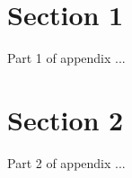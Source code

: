 
\section{Section 1}
\label{sec:appendixSec1}

Part 1 of appendix ...

\section{Section 2}
\label{sec:appendixSec2}

Part 2 of appendix ...
